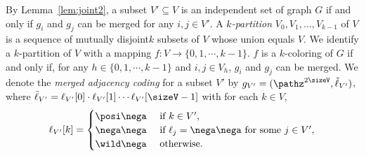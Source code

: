 By Lemma~\ref{lem:joint2}, a subset $V' \subseteq V$ is an independent set of graph $G$ if and only if $g_i$ and $g_j$ can be merged  for any $i, j \in V'$.
A {\em $k$-partition} $V_0, V_1, \ldots, V_{k-1}$ of $V$ is a sequence of mutually disjoint$k$ subsets of $V$ whose union equals $V$.
We identify a $k$-partition of $V$ with a mapping $f:V \rightarrow \{ 0,1,\cdots,k-1 \}$.
$f$ is a $k$-coloring of $G$ if and only if, for any $h \in \{ 0,1,\cdots,k-1 \}$ and $i,j \in V_h$, $g_i$ and $g_j$ can be merged.
We denote the {\em merged adjacency coding} for a subset $V'$ by $g_{V'}=(\pathz^{2\sizeV}, \tilde{\ell}_{V'})$, where $\tilde{\ell}_{V'} = \ell_{V'}[0]\cdot \ell_{V'}[1]\cdots \ell_{V'}[\sizeV-1] $ with for each $k \in V$,
\[
	\ell_{V'}[k] = 
	\begin{cases}
	\posi\nega & \mbox{ if $k \in V'$},\\
	\nega\nega & \mbox{ if $\ell_j = \nega\nega$ for some $j \in V'$},\\
	\wild\nega & \mbox{ otherwise. }
	\end{cases}
\]

